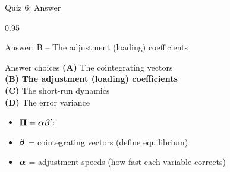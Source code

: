 \documentclass[9pt, aspectratio=169, t]{beamer}
\begin{document}
\begin{frame}{Quiz 6: Answer}
    \begin{cminipage}{0.95\textwidth}
    {\small
    \begin{exampleblock}{Answer: B -- The adjustment (loading) coefficients}

    \begin{block}{Answer choices}
        \textcolor{MainBlue}{\textbf{(A)}} The cointegrating vectors \incorrect\\[3pt]
        \textcolor{MainBlue}{\textbf{(B)}} \textbf{\textcolor{Forest}{The adjustment (loading) coefficients}} \correct\\[3pt]
        \textcolor{MainBlue}{\textbf{(C)}} The short-run dynamics \incorrect\\[3pt]
        \textcolor{MainBlue}{\textbf{(D)}} The error variance \incorrect
    \end{block}

        \vspace{0.2cm}

        \begin{itemize}
            \item \textbf{$\boldsymbol{\Pi} = \boldsymbol{\alpha}\boldsymbol{\beta}'$}:
            \item $\boldsymbol{\beta}$ = cointegrating vectors (define equilibrium)
            \item $\boldsymbol{\alpha}$ = adjustment speeds (how fast each variable corrects)
        \end{itemize}
    \end{exampleblock}
    }
    \end{cminipage}
\end{frame}
\end{document}
